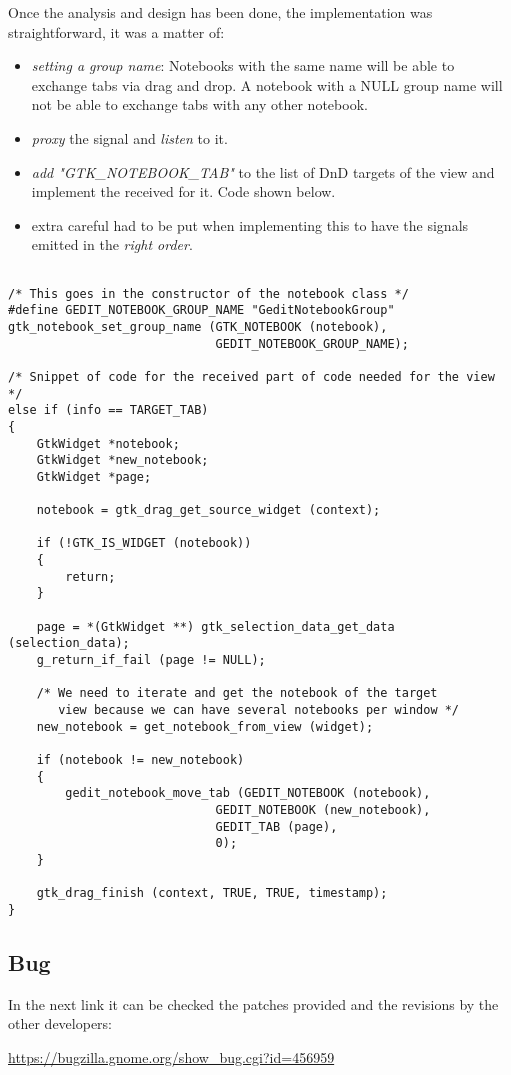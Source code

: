 Once the analysis and design has been done, the implementation was straightforward, it was a matter of:
\begin{itemize}
  \item \emph{setting a group name}: Notebooks with the same name will be able to exchange tabs via drag and drop. A notebook with a NULL group name will not be able to exchange tabs with any other notebook.
  \item \emph{proxy} the signal and \emph{listen} to it.
  \item \emph{add "GTK\_NOTEBOOK\_TAB"} to the list of DnD targets of the view and implement the received for it. Code shown below.
  \item extra careful had to be put when implementing this to have the signals emitted in the \emph{right order}.
\end{itemize}

\begin{lstlisting}[style=GObject]

/* This goes in the constructor of the notebook class */
#define GEDIT_NOTEBOOK_GROUP_NAME "GeditNotebookGroup"
gtk_notebook_set_group_name (GTK_NOTEBOOK (notebook),
                             GEDIT_NOTEBOOK_GROUP_NAME);

/* Snippet of code for the received part of code needed for the view */
else if (info == TARGET_TAB)
{
	GtkWidget *notebook;
	GtkWidget *new_notebook;
	GtkWidget *page;

	notebook = gtk_drag_get_source_widget (context);

	if (!GTK_IS_WIDGET (notebook))
	{
		return;
	}

	page = *(GtkWidget **) gtk_selection_data_get_data (selection_data);
	g_return_if_fail (page != NULL);

	/* We need to iterate and get the notebook of the target
	   view because we can have several notebooks per window */
	new_notebook = get_notebook_from_view (widget);

	if (notebook != new_notebook)
	{
		gedit_notebook_move_tab (GEDIT_NOTEBOOK (notebook),
			                 GEDIT_NOTEBOOK (new_notebook),
			                 GEDIT_TAB (page),
			                 0);
	}

	gtk_drag_finish (context, TRUE, TRUE, timestamp);
}

\end{lstlisting}

\subsection{Bug}

In the next link it can be checked the patches provided and the revisions by the other developers:

\noindent\url{https://bugzilla.gnome.org/show_bug.cgi?id=456959}\label{Bug456959}
